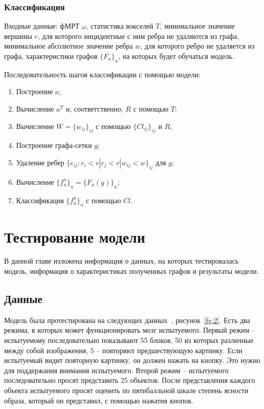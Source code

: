 \documentclass[specialist,
substylefile = spbu_report.rtx,
subf,href,colorlinks=true, 12pt]{disser}
\begin{document}
			\subsection{Классификация}
				Входные данные: фМРТ $\omega$, статистика вокселей $T$, минимальное значение вершины $r$, для которого инцидентные с ним ребра не удаляются из графа, минимальное абсолютное значение ребра $w$, для которого ребро не удаляется из графа, характеристики графов $\{F_u\}_u$, на которых будет обучаться модель.
				
				Последовательность шагов классификации с помощью модели:				
				\begin{enumerate}
					\item Построение $a$;
					\item Вычисление $a^{T}$ и, соответственно, $R$ с помощью $T$;
					\item Вычисление $W = \{w_{ij}\}_{ij}$ с помощью $\{Cl_{ij}\}_{ij}$ и $R$;
					\item Построение графа-сетки $g$;
					\item Удаление ребер $\{e_{ij} : r_i < r | r_j < r | w_{ij} < w\}_{ij}$  для $g$;
					\item Вычисление $\{f^n_u\}_u = \{F_u(g)\}_u$;
					\item Классификация $\{f^n_u\}_u$ с помощью $Cl$.
				\end{enumerate}

	\chapter{Тестирование модели}	
		В данной главе изложена информация о данных, на которых тестировалась модель, информация о характеристиках полученных графов и результаты модели.
		
		\section{Данные}	
			Модель была протестирована на следующих данных~\cite{Horikawa2019}, рисунок~\ref{fg:2}. Есть два режима, в которых может функционировать мозг испытуемого. Первый режим – испытуемому последовательно показывают 55 блоков, 50 из которых различные между собой изображения, 5 – повторяют предшествующую картинку. Если испытуемый видит повторную картинку, он должен нажать на кнопку. Это нужно для поддержания внимания испытуемого. Второй режим – испытуемого последовательно просят представить 25 объектов. После представления каждого объекта испытуемого просят оценить по пятибалльной шкале степень ясности образа, который он представил, с помощью нажатия кнопок.
			
\end{document}
